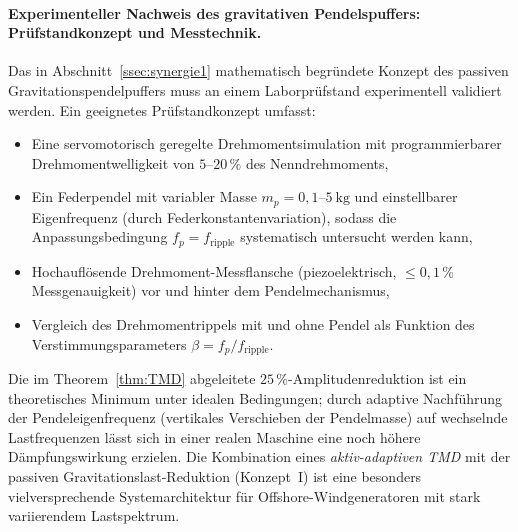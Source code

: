 ﻿\documentclass[12pt, a4paper]{report}
\theoremstyle{definition}
\theoremstyle{remark}
\begin{document}
\paragraph{Experimenteller Nachweis des gravitativen Pendelspuffers:
Prüfstandkonzept und Messtechnik.}
Das in Abschnitt~\ref{ssec:synergie1} mathematisch begründete Konzept des
passiven Gravitationspendelpuffers muss an einem Laborprüfstand experimentell
validiert werden. Ein geeignetes Prüfstandkonzept umfasst:
\begin{itemize}
  \item Eine servomotorisch geregelte Drehmomentsimulation mit programmierbarer
        Drehmomentwelligkeit von $5$--$20\,\%$ des Nenndrehmoments,
  \item Ein Federpendel mit variabler Masse $m_p = 0{,}1$--$\SI{5}{\kilogram}$
        und einstellbarer Eigenfrequenz (durch Federkonstantenvariation), sodass
        die Anpassungsbedingung $f_p = f_{\text{ripple}}$ systematisch untersucht
        werden kann,
  \item Hochauflösende Drehmoment-Messflansche (piezoelektrisch,
        $\leq 0{,}1\,\%$ Messgenauigkeit) vor und hinter dem Pendelmechanismus,
  \item Vergleich des Drehmomentrippels mit und ohne Pendel als Funktion des
        Verstimmungsparameters $\beta = f_p / f_{\text{ripple}}$.
\end{itemize}
Die im Theorem~\ref{thm:TMD} abgeleitete $25\,\%$-Amplitudenreduktion ist ein
theoretisches Minimum unter idealen Bedingungen; durch adaptive Nachführung der
Pendeleigenfrequenz (vertikales Verschieben der Pendelmasse) auf wechselnde
Lastfrequenzen lässt sich in einer realen Maschine eine noch höhere Dämpfungswirkung
erzielen. Die Kombination eines \emph{aktiv-adaptiven TMD} mit der passiven
Gravitationslast-Reduktion (Konzept~I) ist eine besonders vielversprechende
Systemarchitektur für Offshore-Windgeneratoren mit stark variierendem Lastspektrum.
\end{document}
